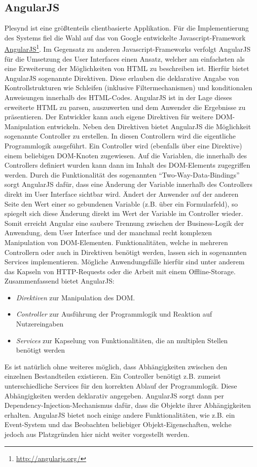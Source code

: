 \subsection{AngularJS}\label{section:angularjs}
Plesynd ist eine größtenteils clientbasierte Applikation. Für die Implementierung des Systems fiel die Wahl auf das von Google entwickelte Javascript-Framework \href{http://angularjs.org/}{AngularJS}\footnote{\url{http://angularjs.org/}}. Im Gegensatz zu anderen Javascript-Frameworks verfolgt AngularJS für die Umsetzung des User Interfaces einen Ansatz, welcher am einfachsten als eine Erweiterung der Möglichkeiten von HTML zu beschreiben ist. Hierfür bietet AngularJS sogenannte Direktiven. Diese erlauben die deklarative Angabe von Kontrollstrukturen wie Schleifen (inklusive Filtermechanismen) und konditionalen Anweisungen innerhalb des HTML-Codes. AngularJS ist in der Lage dieses erweiterte HTML zu parsen, auszuwerten und dem Anwender die Ergebnisse zu präsentieren. Der Entwickler kann auch eigene Direktiven für weitere DOM-Manipulation entwickeln. Neben den Direktiven bietet AngularJS die Möglichkeit sogenannte Controller zu erstellen. In diesen Controllern wird die eigentliche Programmlogik ausgeführt. Ein Controller wird (ebenfalls über eine Direktive) einem beliebigen DOM-Knoten zugewiesen. Auf die Variablen, die innerhalb des Controllers definiert wurden kann dann im Inhalt des DOM-Elements zugegriffen werden. Durch die Funktionalität des sogenannten "`Two-Way-Data-Bindings"' sorgt AngularJS dafür, dass eine Änderung der Variable innerhalb des Controllers direkt im User Interface sichtbar wird. Ändert der Anwender auf der anderen Seite den Wert einer so gebundenen Variable (z.B. über ein Formularfeld), so spiegelt sich diese Änderung direkt im Wert der Variable im Controller wieder. Somit erreicht Angular eine saubere Trennung zwischen der Business-Logik der Anwendung, dem User Interface und der manchmal recht komplexen Manipulation von DOM-Elementen. Funktionalitäten, welche in mehreren Controllern oder auch in Direktiven benötigt werden, lassen sich in sogenannten Services implementieren. Mögliche Anwendungsfälle hierfür sind unter anderem das Kapseln von HTTP-Requests oder die Arbeit mit einem Offline-Storage. Zusammenfassend bietet AngularJS:
\begin{itemize}
 \item \emph{Direktiven} zur Manipulation des DOM.
 \item \emph{Controller} zur Ausführung der Programmlogik und Reaktion auf Nutzereingaben
 \item \emph{Services} zur Kapselung von Funktionalitäten, die an multiplen Stellen benötigt werden
\end{itemize}
Es ist natürlich ohne weiteres möglich, dass Abhängigkeiten zwischen den einzelnen Bestandteilen existieren. Ein Controller benötigt z.B. zumeist unterschiedliche Services für den korrekten Ablauf der Programmlogik. Diese Abhängigkeiten werden deklarativ angegeben. AngularJS sorgt dann per Dependency-Injection-Mechanismus dafür, dass die Objekte ihrer Abhängigkeiten erhalten. AngularJS bietet noch einige andere Funktionalitäten, wie z.B. ein Event-System und das Beobachten beliebiger Objekt-Eigenschaften, welche jedoch aus Platzgründen hier nicht weiter vorgestellt werden.

